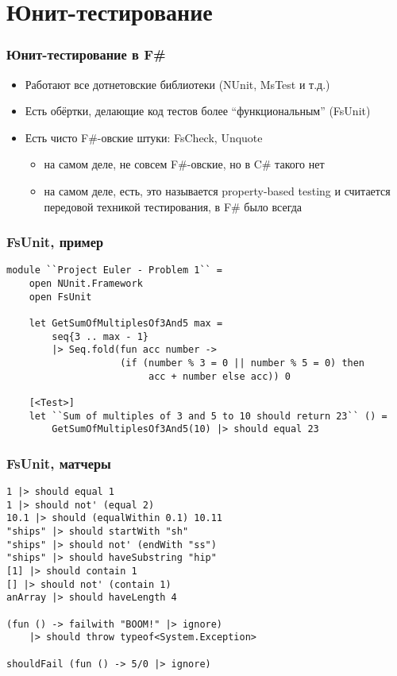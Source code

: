 \documentclass{../../slides-style}
\begin{document}
    
    \begin{frame}[plain]
        \titlepage
    \end{frame}

    \section{Юнит-тестирование}

    \begin{frame}
        \frametitle{Юнит-тестирование в F\#}
        \begin{itemize}
            \item Работают все дотнетовские библиотеки (NUnit, MsTest и т.д.)
            \item Есть обёртки, делающие код тестов более ``функциональным'' (FsUnit)
            \item Есть чисто F\#-овские штуки: FsCheck, Unquote 
            \begin{itemize}
                \item на самом деле, не совсем F\#-овские, но в C\# такого нет
                \item на самом деле, есть, это называется property-based testing и считается передовой техникой тестирования, в F\# было всегда
            \end{itemize}
        \end{itemize}
    \end{frame}

    \begin{frame}[fragile]
        \frametitle{FsUnit, пример}
        \begin{verbatim}
module ``Project Euler - Problem 1`` =
    open NUnit.Framework
    open FsUnit

    let GetSumOfMultiplesOf3And5 max =
        seq{3 .. max - 1} 
        |> Seq.fold(fun acc number ->
                    (if (number % 3 = 0 || number % 5 = 0) then
                         acc + number else acc)) 0

    [<Test>]
    let ``Sum of multiples of 3 and 5 to 10 should return 23`` () =
        GetSumOfMultiplesOf3And5(10) |> should equal 23
        \end{verbatim}
    \end{frame}

    \begin{frame}[fragile]
        \frametitle{FsUnit, матчеры}
        \begin{verbatim}
1 |> should equal 1
1 |> should not' (equal 2)
10.1 |> should (equalWithin 0.1) 10.11
"ships" |> should startWith "sh"
"ships" |> should not' (endWith "ss")
"ships" |> should haveSubstring "hip"
[1] |> should contain 1
[] |> should not' (contain 1)
anArray |> should haveLength 4

(fun () -> failwith "BOOM!" |> ignore) 
    |> should throw typeof<System.Exception>

shouldFail (fun () -> 5/0 |> ignore)
        \end{verbatim}
    \end{frame}
\end{document}
